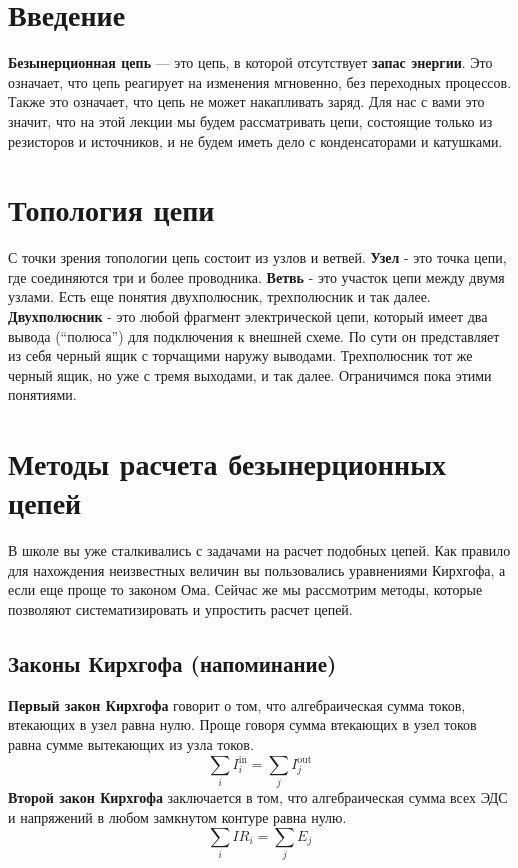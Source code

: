 \documentclass[11pt,a4paper]{article}
\begin{document}
\section*{Введение}
\textbf{Безынерционная цепь} --- это цепь, в которой отсутствует \textbf{запас энергии}. 
Это означает, что цепь реагирует на изменения мгновенно, без переходных процессов. Также 
это означает, что цепь не может накапливать заряд.
Для нас с вами это значит, что на этой лекции мы будем рассматривать цепи, состоящие только
 из резисторов и источников, и не будем иметь дело с конденсаторами и катушками. 

\section*{Топология цепи}
С точки зрения топологии цепь состоит из узлов и ветвей. \textbf{Узел} - это точка цепи, 
где соединяются три и более проводника. \textbf{Ветвь} - это участок цепи между двумя узлами.
Есть еще понятия двухполюсник, трехполюсник и так далее. \textbf{Двухполюсник} - это любой 
фрагмент электрической цепи, который имеет два вывода (``полюса'') для подключения к внешней 
схеме. По сути он представляет из себя черный ящик с торчащими наружу выводами. Трехполюсник
 тот же черный ящик, но уже с тремя выходами, и так далее. Ограничимся пока этими понятиями.

\section*{Методы расчета безынерционных цепей}
В школе вы уже сталкивались с задачами на расчет подобных цепей. Как правило для нахождения
неизвестных величин вы пользовались уравнениями Кирхгофа, а если еще проще то законом Ома.
 Сейчас же мы рассмотрим методы, которые позволяют систематизировать и упростить расчет цепей.

\subsection*{Законы Кирхгофа (напоминание)}
\textbf{Первый закон Кирхгофа} говорит о том, что алгебраическая сумма токов, втекающих в
 узел равна нулю. Проще говоря сумма втекающих в узел токов равна сумме вытекающих из узла токов.
$$
\sum_i I_i^{\text{in}} = \sum_j I_j^{\text{out}} 
$$
\textbf{Второй закон Кирхгофа} заключается в том, что алгебраическая сумма всех ЭДС и
 напряжений в любом замкнутом контуре равна нулю.
$$
\sum \limits_i IR_i = \sum\limits_j E_j
$$
\end{document}
